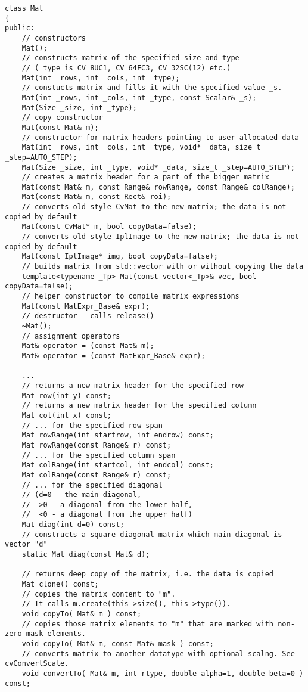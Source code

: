 \begin{lstlisting}
class Mat
{
public:
    // constructors
    Mat();
    // constructs matrix of the specified size and type
    // (_type is CV_8UC1, CV_64FC3, CV_32SC(12) etc.)
    Mat(int _rows, int _cols, int _type);
    // constucts matrix and fills it with the specified value _s.
    Mat(int _rows, int _cols, int _type, const Scalar& _s);
    Mat(Size _size, int _type);
    // copy constructor
    Mat(const Mat& m);
    // constructor for matrix headers pointing to user-allocated data
    Mat(int _rows, int _cols, int _type, void* _data, size_t _step=AUTO_STEP);
    Mat(Size _size, int _type, void* _data, size_t _step=AUTO_STEP);
    // creates a matrix header for a part of the bigger matrix
    Mat(const Mat& m, const Range& rowRange, const Range& colRange);
    Mat(const Mat& m, const Rect& roi);
    // converts old-style CvMat to the new matrix; the data is not copied by default
    Mat(const CvMat* m, bool copyData=false);
    // converts old-style IplImage to the new matrix; the data is not copied by default
    Mat(const IplImage* img, bool copyData=false);
    // builds matrix from std::vector with or without copying the data
    template<typename _Tp> Mat(const vector<_Tp>& vec, bool copyData=false);
    // helper constructor to compile matrix expressions
    Mat(const MatExpr_Base& expr);
    // destructor - calls release()
    ~Mat();
    // assignment operators
    Mat& operator = (const Mat& m);
    Mat& operator = (const MatExpr_Base& expr);

    ...
    // returns a new matrix header for the specified row
    Mat row(int y) const;
    // returns a new matrix header for the specified column
    Mat col(int x) const;
    // ... for the specified row span
    Mat rowRange(int startrow, int endrow) const;
    Mat rowRange(const Range& r) const;
    // ... for the specified column span
    Mat colRange(int startcol, int endcol) const;
    Mat colRange(const Range& r) const;
    // ... for the specified diagonal
    // (d=0 - the main diagonal,
    //  >0 - a diagonal from the lower half,
    //  <0 - a diagonal from the upper half)
    Mat diag(int d=0) const;
    // constructs a square diagonal matrix which main diagonal is vector "d"
    static Mat diag(const Mat& d);

    // returns deep copy of the matrix, i.e. the data is copied
    Mat clone() const;
    // copies the matrix content to "m".
    // It calls m.create(this->size(), this->type()).
    void copyTo( Mat& m ) const;
    // copies those matrix elements to "m" that are marked with non-zero mask elements.
    void copyTo( Mat& m, const Mat& mask ) const;
    // converts matrix to another datatype with optional scalng. See cvConvertScale.
    void convertTo( Mat& m, int rtype, double alpha=1, double beta=0 ) const;


\end{lstlisting}

